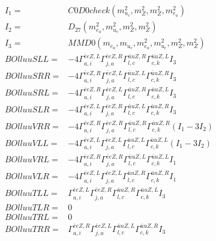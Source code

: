\documentclass[A4,landscape]{article}
\begin{document}
\begin{align} 
I_1 = & C0D0check(m^2_{u_{{c}}}, m^2_{Z}, m^2_{Z}, m^2_{e_{{a}}}) \\ 
I_2 = & D_{27}(m^2_{e_{{a}}}, m^2_{u_{{c}}}, m^2_{Z}, m^2_{Z}) \\ 
I_3 = & MMD0(m_{e_{{a}}}, m_{u_{{c}}}, m^2_{e_{{a}}}, m^2_{u_{{c}}}, m^2_{Z}, m^2_{Z}) \\ 
  BOlluuSLL= & -4  \Gamma^{\bar{e}e Z ,L}_{a, i} \Gamma^{\bar{e}e Z ,R}_{j, a} \Gamma^{\bar{u}u Z ,R}_{l, c} \Gamma^{\bar{u}u Z ,L}_{c, k} I_3 \\ 
  BOlluuSRR= & -4  \Gamma^{\bar{e}e Z ,R}_{a, i} \Gamma^{\bar{e}e Z ,L}_{j, a} \Gamma^{\bar{u}u Z ,L}_{l, c} \Gamma^{\bar{u}u Z ,R}_{c, k} I_3 \\ 
  BOlluuSRL= & -4  \Gamma^{\bar{e}e Z ,R}_{a, i} \Gamma^{\bar{e}e Z ,L}_{j, a} \Gamma^{\bar{u}u Z ,R}_{l, c} \Gamma^{\bar{u}u Z ,L}_{c, k} I_3 \\ 
  BOlluuSLR= & -4  \Gamma^{\bar{e}e Z ,L}_{a, i} \Gamma^{\bar{e}e Z ,R}_{j, a} \Gamma^{\bar{u}u Z ,L}_{l, c} \Gamma^{\bar{u}u Z ,R}_{c, k} I_3 \\ 
  BOlluuVRR= & -4  \Gamma^{\bar{e}e Z ,R}_{a, i} \Gamma^{\bar{e}e Z ,R}_{j, a} \Gamma^{\bar{u}u Z ,R}_{l, c} \Gamma^{\bar{u}u Z ,R}_{c, k} (I_1 - 3 I_2) \\ 
  BOlluuVLL= & -4  \Gamma^{\bar{e}e Z ,L}_{a, i} \Gamma^{\bar{e}e Z ,L}_{j, a} \Gamma^{\bar{u}u Z ,L}_{l, c} \Gamma^{\bar{u}u Z ,L}_{c, k} (I_1 - 3 I_2) \\ 
  BOlluuVRL= & -4  \Gamma^{\bar{e}e Z ,R}_{a, i} \Gamma^{\bar{e}e Z ,R}_{j, a} \Gamma^{\bar{u}u Z ,L}_{l, c} \Gamma^{\bar{u}u Z ,L}_{c, k} I_1 \\ 
  BOlluuVLR= & -4  \Gamma^{\bar{e}e Z ,L}_{a, i} \Gamma^{\bar{e}e Z ,L}_{j, a} \Gamma^{\bar{u}u Z ,R}_{l, c} \Gamma^{\bar{u}u Z ,R}_{c, k} I_1 \\ 
  BOlluuTLL= &  \Gamma^{\bar{e}e Z ,L}_{a, i} \Gamma^{\bar{e}e Z ,R}_{j, a} \Gamma^{\bar{u}u Z ,R}_{l, c} \Gamma^{\bar{u}u Z ,L}_{c, k} I_3 \\ 
  BOlluuTLR= & 0 \\ 
  BOlluuTRL= & 0 \\ 
  BOlluuTRR= &  \Gamma^{\bar{e}e Z ,R}_{a, i} \Gamma^{\bar{e}e Z ,L}_{j, a} \Gamma^{\bar{u}u Z ,L}_{l, c} \Gamma^{\bar{u}u Z ,R}_{c, k} I_3 \\ 
\end{align} 
\end{document}
